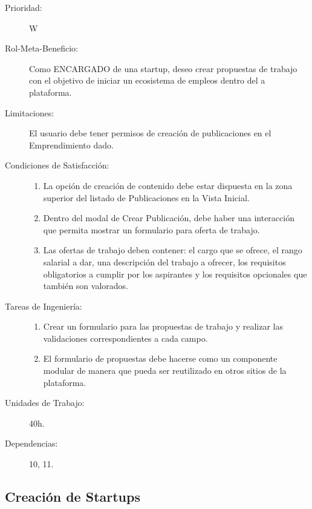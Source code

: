 \begin{description}
    \item[Prioridad:] W
    \item[Rol-Meta-Beneficio:] Como ENCARGADO de una startup, deseo crear propuestas de trabajo con el objetivo de iniciar un ecosistema de empleos dentro del a plataforma.
    \item[Limitaciones:]   El usuario debe tener permisos de creación de publicaciones en el Emprendimiento dado.
    \item[Condiciones de Satisfacción:]  \hfill
        \begin{enumerate}
            \item La opción de creación de contenido debe estar dispuesta en la zona superior del listado de Publicaciones en la Vista Inicial.
            \item Dentro del modal de Crear Publicación, debe haber una interacción que permita mostrar un formulario para oferta de trabajo.
            \item Las ofertas de trabajo deben contener: el cargo que se ofrece, el rango salarial a dar, una descripción del trabajo a ofrecer, los requisitos obligatorios a cumplir por los aspirantes y los requisitos opcionales que también son valorados.
        \end{enumerate}
    \item[Tareas de Ingeniería:]  \hfill
        \begin{enumerate}
            \item Crear un formulario para las propuestas de trabajo y realizar las validaciones correspondientes a cada campo.
    		\item El formulario de propuestas debe hacerse como un componente modular de manera que pueda ser reutilizado en otros sitios de la plataforma. 
        \end{enumerate}
    \item[Unidades de Trabajo:] 40h.
    \item[Dependencias:] 10, 11.
\end{description}

\newpage

\subsection{Creación de Startups}

